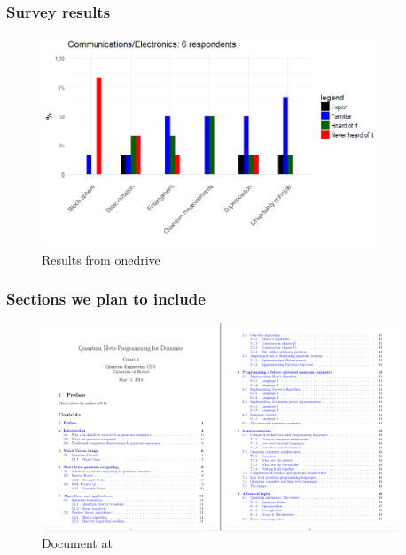 \documentclass{beamer}
\begin{document}
\begin{frame}
\frametitle{Survey results}
\begin{figure}[H]
	\centering
	\includegraphics[width=0.9\textwidth]{Comms_Final.png}
	\caption{Results from onedrive \footnotemark}
	\label{}
\end{figure}
\end{frame}

\begin{frame}
\frametitle{Sections we plan to include}
\begin{figure}[H]
	\centering
	\includegraphics[width=0.95\textwidth]{cohortprojcontents.png}
	\caption{Document at \footnotemark} 
	\label{}
\end{figure}
\end{frame}
\end{document}
